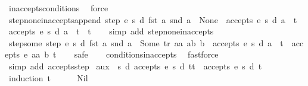 \begin{isabellebody}
\ inaccepts{\isacharunderscore}conditions\ \isamarkupfalse%
\ force%
\endisatagproof
{\isafoldproof}%
%
\isadelimproof
\isanewline
%
\endisadelimproof
\isanewline
{}\isamarkupfalse%
\ step{\isacharunderscore}none{\isacharunderscore}inaccepts{\isacharunderscore}append{\isacharcolon}\ {\isachardoublequoteopen}step\ e\ s\ d\ {\isacharparenleft}fst\ a{\isacharparenright}\ {\isacharparenleft}snd\ a{\isacharparenright}\ {\isacharequal}\ None\ {\isasymLongrightarrow}\ {\isasymnot}accepts\ e\ s\ d\ {\isacharparenleft}a\ {\isacharhash}\ t{\isacharparenright}\ {\isasymand}\ {\isasymnot}accepts\ e\ s\ d\ {\isacharparenleft}a\ {\isacharhash}\ t\ {\isacharat}\ t{\isacharprime}{\isacharparenright}{\isachardoublequoteclose}\isanewline
%
\isadelimproof
\ \ %
\endisadelimproof
%
\isatagproof
{}\isamarkupfalse%
\ {\isacharparenleft}simp\ add{\isacharcolon}\ step{\isacharunderscore}none{\isacharunderscore}inaccepts{\isacharparenright}%
\endisatagproof
{\isafoldproof}%
%
\isadelimproof
\isanewline
%
\endisadelimproof
\isanewline
{}\isamarkupfalse%
\ step{\isacharunderscore}some{\isacharcolon}\ {\isachardoublequoteopen}step\ e\ s\ d\ {\isacharparenleft}fst\ a{\isacharparenright}\ {\isacharparenleft}snd\ a{\isacharparenright}\ {\isacharequal}\ Some\ {\isacharparenleft}tr{\isacharcomma}\ aa{\isacharcomma}\ ab{\isacharcomma}\ b{\isacharparenright}\ {\isasymLongrightarrow}\ accepts\ e\ s\ d\ {\isacharparenleft}a\ {\isacharhash}\ t{\isacharparenright}\ {\isacharequal}\ accepts\ e\ aa\ b\ t{\isachardoublequoteclose}\isanewline
%
\isadelimproof
\ \ %
\endisadelimproof
%
\isatagproof
{}\isamarkupfalse%
\ safe\isanewline
\ \ \isamarkupfalse%
\ conditions{\isacharunderscore}inaccepts\ \isamarkupfalse%
\ fastforce\isanewline
\ \ \isamarkupfalse%
\ {\isacharparenleft}simp\ add{\isacharcolon}\ accepts{\isachardot}step{\isacharparenright}%
\endisatagproof
{\isafoldproof}%
%
\isadelimproof
\isanewline
%
\endisadelimproof
\isanewline
{}\isamarkupfalse%
\ aux{}{\isacharcolon}\ {\isachardoublequoteopen}{\isasymforall}\ s\ d{\isachardot}\ accepts\ e\ s\ d\ {\isacharparenleft}t{\isacharat}t{\isacharprime}{\isacharparenright}\ {\isasymlongrightarrow}\ accepts\ e\ s\ d\ t{\isachardoublequoteclose}\isanewline
%
\isadelimproof
\ \ %
\endisadelimproof
%
\isatagproof
{}\isamarkupfalse%
\ {\isacharparenleft}induction\ t{\isacharparenright}\isanewline
\ \ \ \ \isamarkupfalse%
\ Nil\isanewline
\ \ \ \ \isamarkupfalse%

\end{isabellebody}
